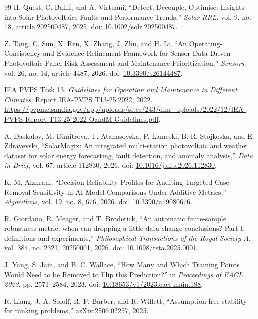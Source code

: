 \documentclass[preprint,12pt]{elsarticle}
\begin{document}
\begin{thebibliography}{99}
 H. Quest, C. Ballif, and A. Virtuani, ``Detect, Decouple, Optimise: Insights into Solar Photovoltaics Faults and Performance Trends,'' \emph{Solar RRL}, vol. 9, no. 18, article 202500487, 2025. doi: \href{https://doi.org/10.1002/solr.202500487}{10.1002/solr.202500487}.

 Z. Tang, C. Sun, X. Ren, X. Zhang, J. Zhu, and H. Li, ``An Operating-Consistency and Evidence-Refinement Framework for Sensor-Data-Driven Photovoltaic Panel Risk Assessment and Maintenance Prioritization,'' \emph{Sensors}, vol. 26, no. 14, article 4487, 2026. doi: \href{https://doi.org/10.3390/s26144487}{10.3390/s26144487}.

 IEA PVPS Task 13, \emph{Guidelines for Operation and Maintenance in Different Climates}, Report IEA-PVPS T13-25:2022, 2022. \url{https://pvpmc.sandia.gov/app/uploads/sites/243/dlm_uploads/2022/12/IEA-PVPS-Report-T13-25-2022-OandM-Guidelines.pdf}.

 A. Daskalov, M. Dimitrova, T. Atanasovska, P. Lameski, B. R. Stojkoska, and E. Zdravevski, ``SolarMagix: An integrated multi-station photovoltaic and weather dataset for solar energy forecasting, fault detection, and anomaly analysis,'' \emph{Data in Brief}, vol. 67, article 112830, 2026. doi: \href{https://doi.org/10.1016/j.dib.2026.112830}{10.1016/j.dib.2026.112830}.

 K. M. Alzhrani, ``Decision Reliability Profiles for Auditing Targeted Case-Removal Sensitivity in AI Model Comparisons Under Additive Metrics,'' \emph{Algorithms}, vol. 19, no. 8, 676, 2026. doi: \href{https://doi.org/10.3390/a19080676}{10.3390/a19080676}.

 R. Giordano, R. Meager, and T. Broderick, ``An automatic finite-sample robustness metric: when can dropping a little data change conclusions? Part I: definitions and experiments,'' \emph{Philosophical Transactions of the Royal Society A}, vol. 384, no. 2321, 20250001, 2026. doi: \href{https://doi.org/10.1098/rsta.2025.0001}{10.1098/rsta.2025.0001}.

 J. Yang, S. Jain, and B. C. Wallace, ``How Many and Which Training Points Would Need to be Removed to Flip this Prediction?'' in \emph{Proceedings of EACL 2023}, pp. 2571--2584, 2023. doi: \href{https://doi.org/10.18653/v1/2023.eacl-main.188}{10.18653/v1/2023.eacl-main.188}.

 R. Liang, J. A. Soloff, R. F. Barber, and R. Willett, ``Assumption-free stability for ranking problems,'' arXiv:2506.02257, 2025.


\end{thebibliography}
\end{document}
